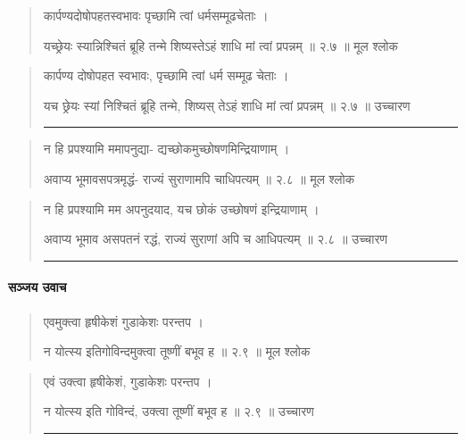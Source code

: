 \begin{quotation}

कार्पण्यदोषोपहतस्वभावः
पृच्छामि त्वां धर्मसम्मूढचेताः  ।  

यच्छ्रेयः स्यान्निश्चितं ब्रूहि तन्मे
शिष्यस्तेऽहं शाधि मां त्वां प्रपन्नम्‌  ॥ २.७ ॥  मूल श्लोक
\end{quotation}

\begin{quotation}

कार्पण्य दोषोपहत स्वभावः, 
पृच्छामि त्वां धर्म सम्मूढ चेताः  ।  

यच छ्रेयः स्यां निश्चितं ब्रूहि तन्मे, 
शिष्यस् तेऽहं शाधि मां त्वां प्रपन्नम्‌  ॥ २.७ ॥  उच्चारण

\noindent\rule{16cm}{0.4pt} 
\end{quotation}


\begin{quotation}

न हि प्रपश्यामि ममापनुद्या-
द्यच्छोकमुच्छोषणमिन्द्रियाणाम्‌  ।  

अवाप्य भूमावसपत्रमृद्धं-
राज्यं सुराणामपि चाधिपत्यम्‌  ॥ २.८ ॥  मूल श्लोक
\end{quotation}

\begin{quotation}



न हि प्रपश्यामि मम अपनुदयाद, 
यच छोकं उच्छोषणं इन्द्रियाणाम्‌  ।  

अवाप्य भूमाव असपतनं रद्धं, 
राज्यं सुराणां अपि च आधिपत्यम्‌  ॥ २.८ ॥  उच्चारण

\noindent\rule{16cm}{0.4pt} 
\end{quotation}

\paragraph{\sanskrit सञ्जय उवाच}

\begin{quotation}

एवमुक्त्वा हृषीकेशं गुडाकेशः परन्तप  ।  

न योत्स्य इतिगोविन्दमुक्त्वा तूष्णीं बभूव ह  ॥ २.९ ॥  मूल श्लोक
\end{quotation}

\begin{quotation}

एवं उक्त्वा हृषीकेशं, गुडाकेशः परन्तप  ।  

न योत्स्य इति गोविन्दं, उक्त्वा तूष्णीं बभूव ह  ॥ २.९ ॥  उच्चारण

\noindent\rule{16cm}{0.4pt} 
\end{quotation}


